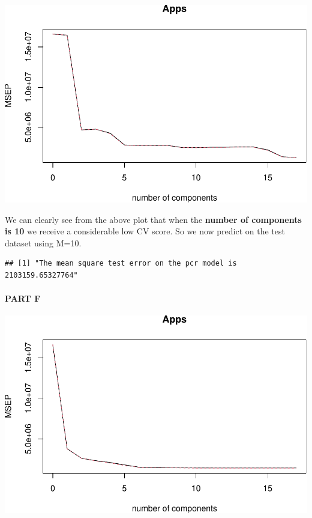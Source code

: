 \documentclass[
]{article}
\begin{document}
\begin{center}\includegraphics{Disha_Gandhi_Take_Home_Exam_PDF_files/figure-latex/unnamed-chunk-53-1} \end{center}

We can clearly see from the above plot that when the \textbf{number of
components is 10} we receive a considerable low CV score. So we now
predict on the test dataset using M=10.

\begin{verbatim}
## [1] "The mean square test error on the pcr model is 2103159.65327764"
\end{verbatim}

\hypertarget{part-f-1}{%
\paragraph{PART F}\label{part-f-1}}

\begin{center}\includegraphics{Disha_Gandhi_Take_Home_Exam_PDF_files/figure-latex/unnamed-chunk-55-1} \end{center}
\end{document}
